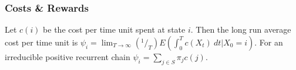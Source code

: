 \subsubsection*{Costs \& Rewards}
 Let $c(i)$ be the cost per time unit spent at state $i$. Then the long run average cost per time unit is 
$\psi_i = \lim_{T \to \infty} (^1/_T) E(\int^T_0 c(X_t)\ dt | X_0 = i)$.
 For an irreducible positive recurrent chain $\psi_i = \sum_{j \in S} \pi_j c(j).$